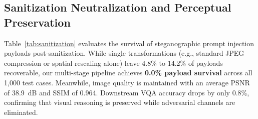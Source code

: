 \documentclass[conference]{IEEEtran}
\begin{document}
\begin{table}[t]
\caption{End-to-End Latency Breakdown Across Ingestion Paths}
\label{tab:latency}
\centering
\vspace{-1.5mm}
\vspace{1.5mm}
\end{table}

\subsection{Sanitization Neutralization and Perceptual Preservation}
Table~\ref{tab:sanitization} evaluates the survival of steganographic prompt injection payloads post-sanitization. While single transformations (e.g., standard JPEG compression or spatial rescaling alone) leave 4.8\% to 14.2\% of payloads recoverable, our multi-stage pipeline achieves \textbf{0.0\% payload survival} across all 1,000 test cases. Meanwhile, image quality is maintained with an average PSNR of 38.9~dB and SSIM of 0.964. Downstream VQA accuracy drops by only 0.8\%, confirming that visual reasoning is preserved while adversarial channels are eliminated.
\end{document}
